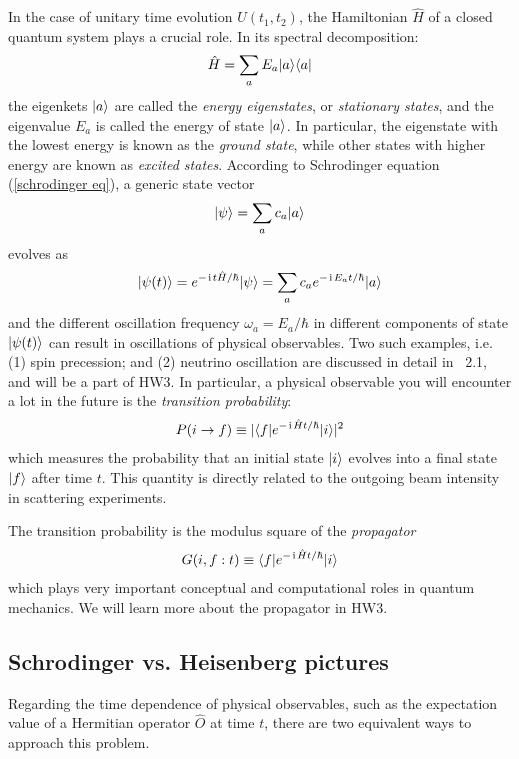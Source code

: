 In the case of unitary time evolution $U(t_1,t_2)$, the Hamiltonian $\hat H$ of a closed quantum system plays a crucial role. In its spectral decomposition:
\begin{align}
\hat H=\sum_aE_a|{a}\rangle\langle{a}|
\end{align}
the eigenkets $|{a}\rangle$ are called the \emph{energy eigenstates}, or \emph{stationary states}, and the eigenvalue $E_a$ is called the energy of state $|{a}\rangle$. In particular, the eigenstate with the lowest energy is known as the \emph{ground state}, while other states with higher energy are known as \emph{excited states}. According to Schrodinger equation (\ref{schrodinger eq}), a generic state vector
\begin{align}
|{\psi}\rangle=\sum_ac_a|{a}\rangle
\end{align}
evolves as
\begin{align}
|{\psi(t)}\rangle=e^{-\hspace{1pt}\mathrm{i}\hspace{1pt} t\hat H/\hbar}|{\psi}\rangle=\sum_ac_ae^{-\hspace{1pt}\mathrm{i}\hspace{1pt} E_at/\hbar}|{a}\rangle
\end{align}
and the different oscillation frequency $\omega_a=E_a/\hbar$ in different components of state $|{\psi(t)}\rangle$ can result in oscillations of physical observables. Two such examples, i.e. (1) spin precession; and (2) neutrino oscillation are discussed in detail in \sakurai~2.1, and will be a part of HW3. In particular, a physical observable you will encounter a lot in the future is the \emph{transition probability}:
\begin{align}
P(i\rightarrow f)\equiv|\langle{f|e^{-\hspace{1pt}\mathrm{i}\hspace{1pt}\hat Ht/\hbar}|i}\rangle|^2
\end{align}
which measures the probability that an initial state $|{i}\rangle$ evolves into a final state $|{f}\rangle$ after time $t$. This quantity is directly related to the outgoing beam intensity in scattering experiments.

The transition probability is the modulus square of the \emph{propagator}
\begin{align}
    G(i,f:t)\equiv\langle{f|e^{-\hspace{1pt}\mathrm{i}\hspace{1pt}\hat Ht/\hbar}|i}\rangle
\end{align}
which plays very important conceptual and computational roles in quantum mechanics. We will learn more about the propagator in HW3. 

\subsection{Schrodinger vs. Heisenberg pictures}

Regarding the time dependence of physical observables, such as the expectation value of a Hermitian operator $\hat O$ at time $t$, there are two equivalent ways to approach this problem. 

